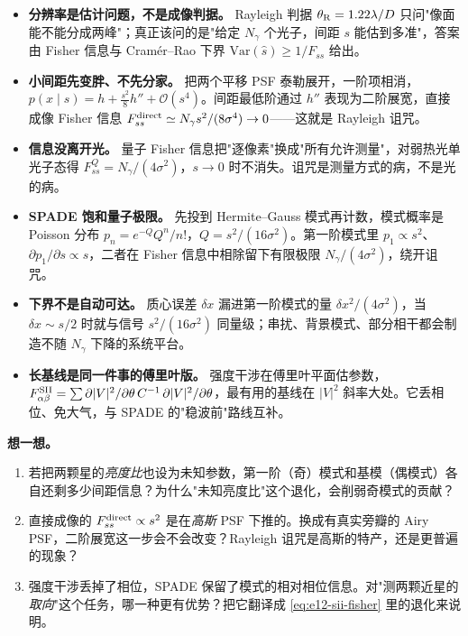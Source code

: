 \begin{itemize}
  \item \textbf{分辨率是估计问题，不是成像判据。} Rayleigh 判据 \(\theta_{\rm R}=1.22\lambda/D\) 只问"像面能不能分成两峰"；真正该问的是"给定 \(N_\gamma\) 个光子，间距 \(s\) 能估到多准"，答案由 Fisher 信息与 Cramér--Rao 下界 \(\mathrm{Var}(\hat s)\ge1/F_{ss}\) 给出。
  \item \textbf{小间距先变胖、不先分家。} 把两个平移 PSF 泰勒展开，一阶项相消，\(p(x\mid s)=h+\tfrac{s^2}{8}h''+\mathcal O(s^4)\)。间距最低阶通过 \(h''\) 表现为二阶展宽，直接成像 Fisher 信息 \(F_{ss}^{\rm direct}\simeq N_\gamma s^2/(8\sigma^4)\to0\)——这就是 Rayleigh 诅咒。
  \item \textbf{信息没离开光。} 量子 Fisher 信息把"逐像素"换成"所有允许测量"，对弱热光单光子态得 \(F_{ss}^{Q}=N_\gamma/(4\sigma^2)\)，\(s\to0\) 时不消失。诅咒是测量方式的病，不是光的病。
  \item \textbf{SPADE 饱和量子极限。} 先投到 Hermite--Gauss 模式再计数，模式概率是 Poisson 分布 \(p_n=e^{-Q}Q^n/n!\)，\(Q=s^2/(16\sigma^2)\)。第一阶模式里 \(p_1\propto s^2\)、\(\partial p_1/\partial s\propto s\)，二者在 Fisher 信息中相除留下有限极限 \(N_\gamma/(4\sigma^2)\)，绕开诅咒。
  \item \textbf{下界不是自动可达。} 质心误差 \(\delta x\) 漏进第一阶模式的量 \(\delta x^2/(4\sigma^2)\)，当 \(\delta x\sim s/2\) 时就与信号 \(s^2/(16\sigma^2)\) 同量级；串扰、背景模式、部分相干都会制造不随 \(N_\gamma\) 下降的系统平台。
  \item \textbf{长基线是同一件事的傅里叶版。} 强度干涉在傅里叶平面估参数，\(F^{\rm SII}_{\alpha\beta}=\sum\partial|V|^2/\partial\theta\,C^{-1}\,\partial|V|^2/\partial\theta\)，最有用的基线在 \(|V|^2\) 斜率大处。它丢相位、免大气，与 SPADE 的"稳波前"路线互补。
\end{itemize}

\medskip
\noindent\textbf{想一想。}
\begin{enumerate}
  \item 若把两颗星的\emph{亮度比}也设为未知参数，第一阶（奇）模式和基模（偶模式）各自还剩多少间距信息？为什么"未知亮度比"这个退化，会削弱奇模式的贡献？
  \item 直接成像的 \(F_{ss}^{\rm direct}\propto s^2\) 是在\emph{高斯} PSF 下推的。换成有真实旁瓣的 Airy PSF，二阶展宽这一步会不会改变？Rayleigh 诅咒是高斯的特产，还是更普遍的现象？
  \item 强度干涉丢掉了相位，SPADE 保留了模式的相对相位信息。对"测两颗近星的\emph{取向}"这个任务，哪一种更有优势？把它翻译成 \eqref{eq:e12-sii-fisher} 里的退化来说明。
\end{enumerate}
